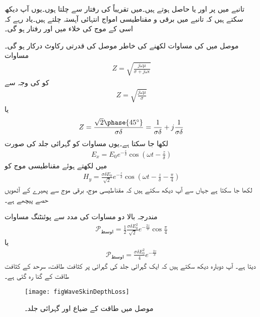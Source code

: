 تانبے میں  پر  اور  یا  حاصل ہوتے ہیں۔میں تقریباً  کی رفتار سے چلتا ہوں۔یوں آپ دیکھ سکتے ہیں کہ تانبے میں برقی و مقناطیسی امواج انتہائی آہستہ چلتے ہیں۔یاد رہے کہ اسی  کے موج کی خلاء میں  اور  رفتار  ہو گی۔

موصل میں  کی مساوات لکھنے کی خاطر موصل کی قدرتی رکاوٹ درکار ہو گی۔مساوات 
\begin{align*}
Z =\sqrt{\frac{j \omega \mu}{\sigma +j \omega \epsilon}}
\end{align*}
کو  کی وجہ سے
\begin{align*}
Z=\sqrt{\frac{j\omega\mu}{\sigma}}
\end{align*}
یا
\begin{align}\label{مساوات_موج_قدرتی_رکاوٹ_موصل_گہرائی_جلد_کے_ساتھ}
Z=\frac{\sqrt{2}\phase{45^\circ}}{\sigma \delta}=\frac{1}{\sigma \delta}+j\frac{1}{\sigma \delta}
\end{align}
لکھا جا سکتا ہے۔یوں مساوات  کو گہرائی جلد کی صورت
\begin{align}
E_x=E_0 e^{-\frac{z}{\delta}} \cos \left(\omega t -\frac{z}{\delta}\right)
\end{align}
 میں لکھتے ہوئے مقناطیسی موج کو
\begin{align}
H_y=\frac{\sigma \delta E_0}{\sqrt{2}} e^{-\frac{z}{\delta}} \cos \left(\omega t-\frac{z}{\delta}-\frac{\pi}{4}\right)
\end{align}
لکھا جا سکتا ہے جہاں سے آپ دیکھ سکتے ہیں کہ مقناطیسی موج، برقی موج سے  پھیرے کے آٹھویں حصے پیچھے ہے۔

مندرجہ بالا دو مساوات کی مدد سے پوئنٹنگ مساوات
 \begin{align*}
\mathscr{P}_{\text{اوسط}}=\frac{1}{2} \frac{\sigma \delta E_0^2}{\sqrt{2}} e^{-\frac{2 z}{\delta}} \cos \frac{\pi}{4}
\end{align*}
یا
\begin{align*}
\mathscr{P}_{\text{اوسط}}=\frac{\sigma \delta E_0^2}{4} e^{-\frac{2 z}{\delta}}
\end{align*}
دیتا ہے۔ آپ دوبارہ دیکھ سکتے ہیں کہ ایک گہرائی جلد کی گہرائی پر کثافت طاقت، سرحد کے کثافت طاقت کے  گنا رہ گئی ہے۔

\begin{figure}
\centering
\texttt{[image: figWaveSkinDepthLoss]}
\caption{موصل میں طاقت کے ضیاع اور گہرائی جلد۔}
\label{شکل_موج_گہرائی_جلد_اور_طاقتی_ضیاع}
\end{figure}

